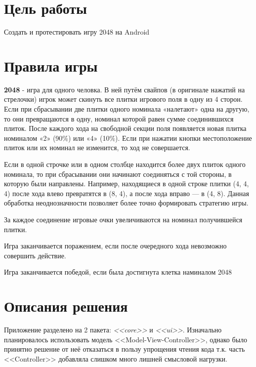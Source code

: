 









\section{Цель работы}
Создать и протестировать игру 2048 на Android

\section{Правила игры}
\textbf{2048} - игра для одного человка. В ней путём свайпов (в оригинале нажатий на стрелочки) игрок может скинуть все плитки игрового поля в одну из 4 сторон. Если при сбрасывании две плитки одного номинала «налетают» одна на другую, то они превращаются в одну, номинал которой равен сумме соединившихся плиток. После каждого хода на свободной секции поля появляется новая плитка номиналом «2» (90\%) или «4» (10\%). Если при нажатии кнопки местоположение плиток или их номинал не изменится, то ход не совершается.

Если в одной строчке или в одном столбце находится более двух плиток одного номинала, то при сбрасывании они начинают соединяться с той стороны, в которую были направлены. Например, находящиеся в одной строке плитки (4, 4, 4) после хода влево превратятся в (8, 4), а после хода вправо — в (4, 8). Данная обработка неоднозначности позволяет более точно формировать стратегию игры.

За каждое соединение игровые очки увеличиваются на номинал получившейся плитки.

Игра заканчивается поражением, если после очередного хода невозможно совершить действие.

Игра заканчивается победой, если была достигнута клетка наминалом 2048

\section{Описания решения}
Приложение разделено на 2 пакета: \textit{<<core>>} и \textit{<<ui>>}. Изначально планировалось использовать модель <<Model-View-Controller>>, однако было принятно решение от неё отказаться в пользу упрощения чтения кода т.к. часть <<Controller>> добавляла слишком много лишней смысловой нагрузки.

